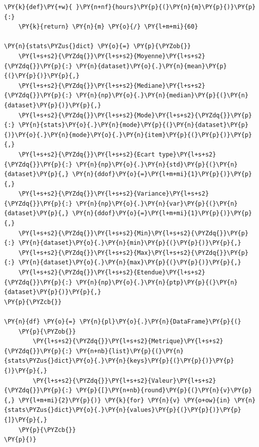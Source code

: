     \begin{tcolorbox}[breakable, size=fbox, boxrule=1pt, pad at break*=1mm,colback=cellbackground, colframe=cellborder]
\begin{Verbatim}[commandchars=\\\{\}]
\PY{k}{def}\PY{+w}{ }\PY{n+nf}{hours}\PY{p}{(}\PY{n}{m}\PY{p}{)}\PY{p}{:}
    \PY{k}{return} \PY{n}{m} \PY{o}{/} \PY{l+m+mi}{60}

\PY{n}{stats\PYZus{}dict} \PY{o}{=} \PY{p}{\PYZob{}}
    \PY{l+s+s2}{\PYZdq{}}\PY{l+s+s2}{Moyenne}\PY{l+s+s2}{\PYZdq{}}\PY{p}{:} \PY{n}{dataset}\PY{o}{.}\PY{n}{mean}\PY{p}{(}\PY{p}{)}\PY{p}{,}
    \PY{l+s+s2}{\PYZdq{}}\PY{l+s+s2}{Mediane}\PY{l+s+s2}{\PYZdq{}}\PY{p}{:} \PY{n}{np}\PY{o}{.}\PY{n}{median}\PY{p}{(}\PY{n}{dataset}\PY{p}{)}\PY{p}{,}
    \PY{l+s+s2}{\PYZdq{}}\PY{l+s+s2}{Mode}\PY{l+s+s2}{\PYZdq{}}\PY{p}{:} \PY{n}{stats}\PY{o}{.}\PY{n}{mode}\PY{p}{(}\PY{n}{dataset}\PY{p}{)}\PY{o}{.}\PY{n}{mode}\PY{o}{.}\PY{n}{item}\PY{p}{(}\PY{p}{)}\PY{p}{,}
    \PY{l+s+s2}{\PYZdq{}}\PY{l+s+s2}{Ecart type}\PY{l+s+s2}{\PYZdq{}}\PY{p}{:} \PY{n}{np}\PY{o}{.}\PY{n}{std}\PY{p}{(}\PY{n}{dataset}\PY{p}{,} \PY{n}{ddof}\PY{o}{=}\PY{l+m+mi}{1}\PY{p}{)}\PY{p}{,}
    \PY{l+s+s2}{\PYZdq{}}\PY{l+s+s2}{Variance}\PY{l+s+s2}{\PYZdq{}}\PY{p}{:} \PY{n}{np}\PY{o}{.}\PY{n}{var}\PY{p}{(}\PY{n}{dataset}\PY{p}{,} \PY{n}{ddof}\PY{o}{=}\PY{l+m+mi}{1}\PY{p}{)}\PY{p}{,}
    \PY{l+s+s2}{\PYZdq{}}\PY{l+s+s2}{Min}\PY{l+s+s2}{\PYZdq{}}\PY{p}{:} \PY{n}{dataset}\PY{o}{.}\PY{n}{min}\PY{p}{(}\PY{p}{)}\PY{p}{,}
    \PY{l+s+s2}{\PYZdq{}}\PY{l+s+s2}{Max}\PY{l+s+s2}{\PYZdq{}}\PY{p}{:} \PY{n}{dataset}\PY{o}{.}\PY{n}{max}\PY{p}{(}\PY{p}{)}\PY{p}{,}
    \PY{l+s+s2}{\PYZdq{}}\PY{l+s+s2}{Etendue}\PY{l+s+s2}{\PYZdq{}}\PY{p}{:} \PY{n}{np}\PY{o}{.}\PY{n}{ptp}\PY{p}{(}\PY{n}{dataset}\PY{p}{)}\PY{p}{,}
\PY{p}{\PYZcb{}}

\PY{n}{df} \PY{o}{=} \PY{n}{pl}\PY{o}{.}\PY{n}{DataFrame}\PY{p}{(}
    \PY{p}{\PYZob{}}
        \PY{l+s+s2}{\PYZdq{}}\PY{l+s+s2}{Metrique}\PY{l+s+s2}{\PYZdq{}}\PY{p}{:} \PY{n+nb}{list}\PY{p}{(}\PY{n}{stats\PYZus{}dict}\PY{o}{.}\PY{n}{keys}\PY{p}{(}\PY{p}{)}\PY{p}{)}\PY{p}{,}
        \PY{l+s+s2}{\PYZdq{}}\PY{l+s+s2}{Valeur}\PY{l+s+s2}{\PYZdq{}}\PY{p}{:} \PY{p}{[}\PY{n+nb}{round}\PY{p}{(}\PY{n}{v}\PY{p}{,} \PY{l+m+mi}{2}\PY{p}{)} \PY{k}{for} \PY{n}{v} \PY{o+ow}{in} \PY{n}{stats\PYZus{}dict}\PY{o}{.}\PY{n}{values}\PY{p}{(}\PY{p}{)}\PY{p}{]}\PY{p}{,}
    \PY{p}{\PYZcb{}}
\PY{p}{)}
\end{Verbatim}
\end{tcolorbox}

